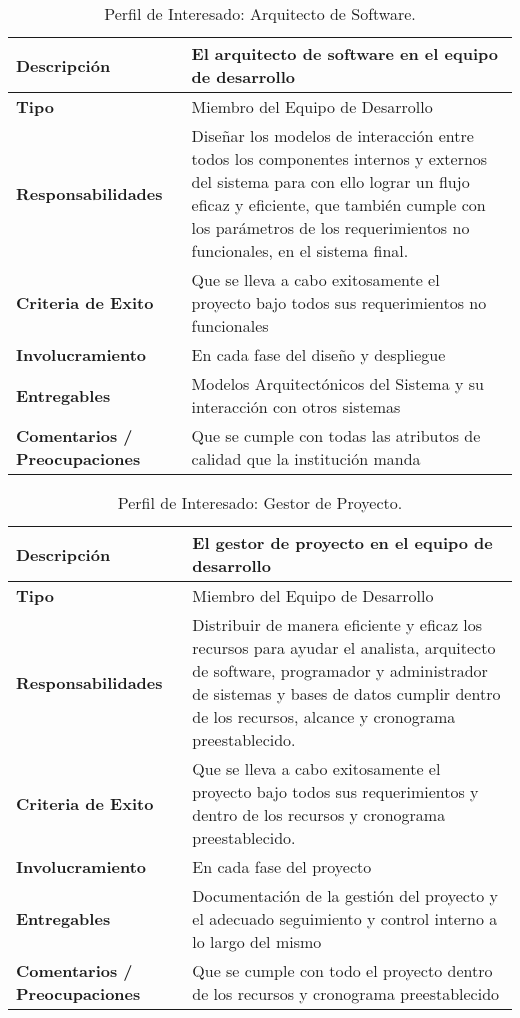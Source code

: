 \begin{table}[h!]
  \begin{tabular}{|p{}|p{}|}
    \hline
    \textbf{Descripción} & El arquitecto de software en el equipo de desarrollo \\
    \hline
    \textbf{Tipo} & Miembro del Equipo de Desarrollo \\
    \hline
    \textbf{Responsabilidades} & Diseñar los modelos de interacción entre todos los componentes internos y externos del sistema para con ello lograr un flujo eficaz y eficiente, que también cumple con los parámetros de los requerimientos no funcionales, en el sistema final. \\
    \hline
    \textbf{Criteria de Exito} & Que se lleva a cabo exitosamente el proyecto bajo todos sus requerimientos no funcionales \\
    \hline
    \textbf{Involucramiento} & En cada fase del diseño y despliegue \\
    \hline
    \textbf{Entregables} & Modelos Arquitectónicos del Sistema y su interacción con otros sistemas \\
    \hline
    \textbf{Comentarios / Preocupaciones} & Que se cumple con todas las atributos de calidad que la institución manda \\
    \hline
  \end{tabular}
  \caption{Perfil de Interesado: Arquitecto de Software.}
  \label{per-inter-arquitecto}
\end{table}

\begin{table}[h!]
  \begin{tabular}{|p{}|p{}|}
    \hline
    \textbf{Descripción} & El gestor de proyecto en el equipo de desarrollo \\
    \hline
    \textbf{Tipo} & Miembro del Equipo de Desarrollo \\
    \hline
    \textbf{Responsabilidades} & Distribuir de manera eficiente y eficaz los recursos para ayudar el analista, arquitecto de software, programador y administrador de sistemas y bases de datos cumplir dentro de los recursos, alcance y cronograma preestablecido. \\
    \hline
    \textbf{Criteria de Exito} & Que se lleva a cabo exitosamente el proyecto bajo todos sus requerimientos y dentro de los recursos y cronograma preestablecido. \\
    \hline
    \textbf{Involucramiento} & En cada fase del proyecto \\
    \hline
    \textbf{Entregables} & Documentación de la gestión del proyecto y el adecuado seguimiento y control interno a lo largo del mismo \\
    \hline
    \textbf{Comentarios / Preocupaciones} & Que se cumple con todo el proyecto dentro de los recursos y cronograma preestablecido \\
    \hline
  \end{tabular}
  \caption{Perfil de Interesado: Gestor de Proyecto.}
  \label{per-inter-project-manager}
\end{table}

